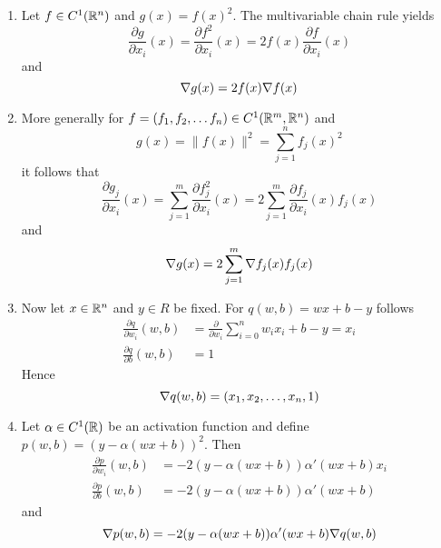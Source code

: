 \begin{remarks}
    \hfill
    \begin{enumerate}
        \item Let \( f \in C^1(\mathbb{R}^n) \) and \( g(x) = {f(x)}^2 \). The multivariable  chain rule yields
              \[
                  \frac{\partial g}{\partial x_i}(x)
                  = \frac{\partial f^2}{\partial x_i}(x)
                  = 2 f(x) \frac{\partial f}{\partial x_i}(x)
              \]
              and
              \[
                  \nabla g(x) = 2 f(x) \nabla f(x)
              \]
        \item More generally for \( f = (f_1, f_2, \dots f_n)\in C^1(\mathbb{R}^m,\mathbb{R}^n) \) and
              \[
                  g(x) = \|f(x)\|^2 = \sum_{j = 1}^n {f_j(x)}^2
              \]
              it follows that
              \[
                  \frac{\partial g_j}{\partial x_i}(x)
                  = \sum_{j = 1}^m \frac{\partial f_j^2}{\partial x_i}(x)
                  = 2 \sum_{j = 1}^m \frac{\partial f_j}{\partial x_i}(x) f_j(x)
              \]
              and
              \[
                  \nabla g(x) = 2 \sum_{j = 1}^m \nabla f_j(x) f_j(x)
              \]
        \item Now let \( x \in \mathbb{R}^n \) and \( y \in R \) be fixed. For \( q(w, b) = wx + b - y \) follows
              \[
                  \begin{split}
                      \frac{\partial q}{\partial w_i}(w, b) &=
                      \frac{\partial}{\partial w_i} \sum_{i = 0}^n w_i x_i + b - y = x_i \\
                      \frac{\partial q}{\partial b}(w, b) &= 1
                  \end{split}
              \]
              Hence
              \[
                  \nabla q(w, b) = (x_1, x_2, \dots, x_n, 1)
              \]
        \item Let \( \alpha \in C^1(\mathbb{R}) \) be an activation function and define
              \( p(w,b) = {(y - \alpha(wx + b))}^2 \).
              Then
              \[
                  \begin{split}
                      \frac{\partial p}{\partial w_i}(w, b) &= -2 (y - \alpha(wx + b)) \alpha'(wx + b) x_i  \\
                      \frac{\partial p}{\partial b}(w, b) &= -2 (y - \alpha(wx + b)) \alpha'(wx + b)
                  \end{split}
              \]
              and
              \[
                  \nabla p(w, b) = -2 (y - \alpha(wx + b)) \alpha'(wx + b)\nabla q(w, b)
              \]
    \end{enumerate}
\end{remarks}
\bigskip


